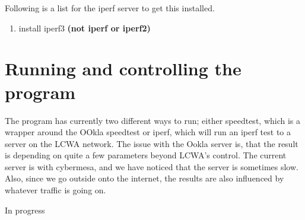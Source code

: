 \documentclass[12pt]{article}
\begin{document}
Following is a list for the iperf server to get this installed.

\begin{enumerate}
\item install iperf3 \textbf{(not iperf or iperf2)}
\end{enumerate}



\section{Running and controlling the program}

The program has currently two different ways to run; either speedtest, which is a wrapper around the OOkla speedtest  or iperf, which will run an iperf test to a server on the LCWA network. The issue with the Ookla server is, that the result is depending on quite a few parameters beyond LCWA's control. The current server is with cybermesa,
and we have noticed that the server is sometimes slow. Also, since we go outside onto the internet, the results are also influenced by whatever traffic is going on.

In progress



\end{document}
